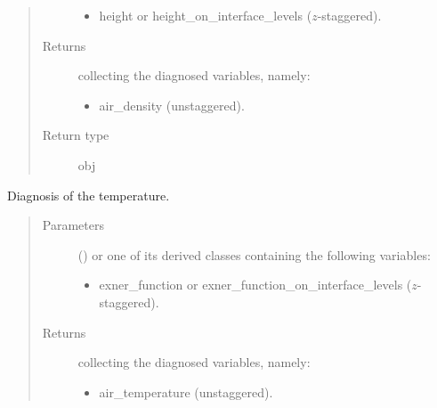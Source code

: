 \documentclass[letterpaper,10pt,english]{sphinxmanual}
\begin{document}
\begin{fulllineitems}
\begin{fulllineitems}
\begin{quote}
\begin{description}
\begin{itemize}
\item {} 
height or height\_on\_interface\_levels (\(z\)-staggered).

\end{itemize}


\item[{Returns}] \leavevmode

{\hyperref[\detokenize{api:tasmania.storages.grid_data.GridData}]{}} collecting the diagnosed variables, namely:
\begin{itemize}
\item {} 
air\_density (unstaggered).

\end{itemize}


\item[{Return type}] \leavevmode
obj

\end{description}\end{quote}

\end{fulllineitems}


\begin{fulllineitems}
\label{\detokenize{api:tasmania.dycore.diagnostic_isentropic.DiagnosticIsentropic.get_air_temperature}}
Diagnosis of the temperature.
\begin{quote}\begin{description}
\item[{Parameters}] \leavevmode
{} () \textendash{} 
{\hyperref[\detokenize{api:tasmania.storages.grid_data.GridData}]{}} or one of its derived classes containing the following variables:
\begin{itemize}
\item {} 
exner\_function or exner\_function\_on\_interface\_levels (\(z\)-staggered).

\end{itemize}


\item[{Returns}] \leavevmode

{\hyperref[\detokenize{api:tasmania.storages.grid_data.GridData}]{}} collecting the diagnosed variables, namely:
\begin{itemize}
\item {} 
air\_temperature (unstaggered).


\end{itemize}
\end{description}
\end{quote}
\end{fulllineitems}
\end{fulllineitems}
\end{document}
